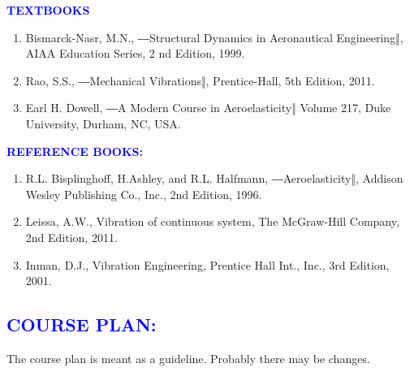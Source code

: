 \documentclass[11pt]{exam}
\begin{document}
\raggedright	\textcolor{blue}{\textbf{TEXTBOOKS}}\\
\begin{enumerate}
		\item Bismarck-Nasr, M.N., ―Structural Dynamics in Aeronautical Engineering‖, AIAA Education Series, 2 nd Edition, 1999.
		\item Rao, S.S., ―Mechanical Vibrations‖, Prentice-Hall, 5th Edition, 2011.
\item Earl H. Dowell, ―A Modern Course in Aeroelasticity‖ Volume 217, Duke University, Durham, NC, USA.
	\end{enumerate}
  \textcolor{blue}{\textbf{REFERENCE BOOKS:}}\\
\begin{enumerate}
	\vspace{-0.25cm}
	\item	R.L. Bisplinghoff, H.Ashley, and R.L. Halfmann, ―Aeroelasticity‖, Addison Wesley Publishing Co., Inc., 2nd Edition, 1996.
\item	Leissa, A.W., Vibration of continuous system, The McGraw-Hill Company, 2nd Edition, 2011. 
\item	Inman, D.J., Vibration Engineering, Prentice Hall Int., Inc., 3rd Edition, 2001.
\end{enumerate}
\vspace{-1cm}
\textcolor{blue}{\section{\large \bfseries	COURSE PLAN:}}
The course plan is meant as a guideline. Probably there may be changes.
\end{document}
